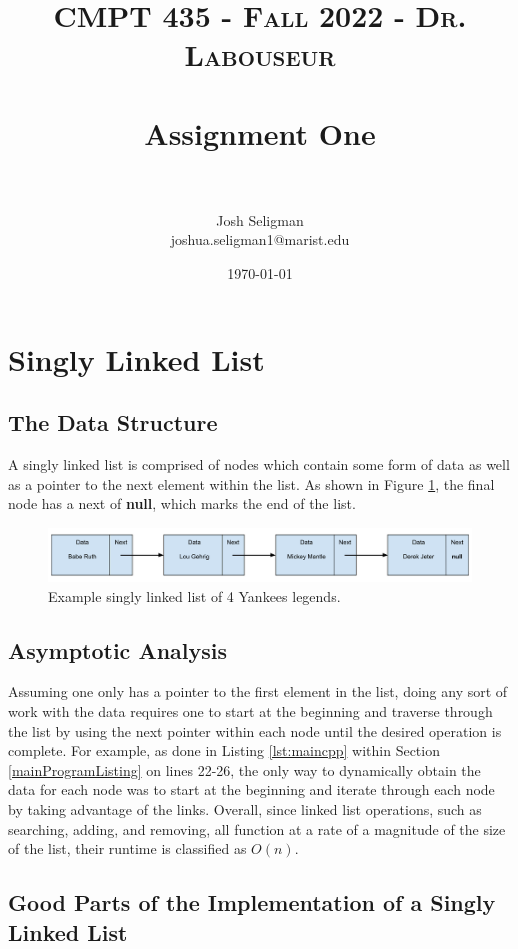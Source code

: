 \documentclass[letterpaper, 10pt,DIV=13]{scrartcl}
\title{	
   \normalfont \normalsize 
   \textsc{CMPT 435 - Fall 2022 - Dr. Labouseur} \\[10pt] %
   \horrule{0.5pt} \\[0.25cm] 	%
   \huge Assignment One  \\     	    %
   \horrule{0.5pt} \\[0.25cm] 	%
}
\author{Josh Seligman \\ \normalsize joshua.seligman1@marist.edu}
\date{\normalsize\today} 	%
\numberwithin{equation}{section} %
\numberwithin{figure}{section} %
\numberwithin{table}{section} %
\begin{document}
\maketitle %

\section{Singly Linked List}\label{linkedListSection}
\subsection{The Data Structure}\label{linkedListDataStructure}
A singly linked list is comprised of nodes which contain some form of data as well as a pointer to the next element within the list. As shown in Figure \ref{figure:linkedList}, the final node has a next of \textbf{null}, which marks the end of the list.

\begin{figure}[ht] 
    \centering 
    \includegraphics[width=15cm]{linkedList}
    \caption{Example singly linked list of 4 Yankees legends.}
    \label{figure:linkedList}
 \end{figure}

\subsection{Asymptotic Analysis}
Assuming one only has a pointer to the first element in the list, doing any sort of work with the data requires one to start at the beginning and traverse through the list by using the next pointer within each node until the desired operation is complete. For example, as done in Listing \ref{lst:maincpp} within Section \ref{mainProgramListing} on lines 22-26, the only way to dynamically obtain the data for each node was to start at the beginning and iterate through each node by taking advantage of the links. Overall, since linked list operations, such as searching, adding, and removing, all function at a rate of a magnitude of the size of the list, their runtime is classified as $O(n)$.

\subsection{Good Parts of the Implementation of a Singly Linked List}
\end{document}

